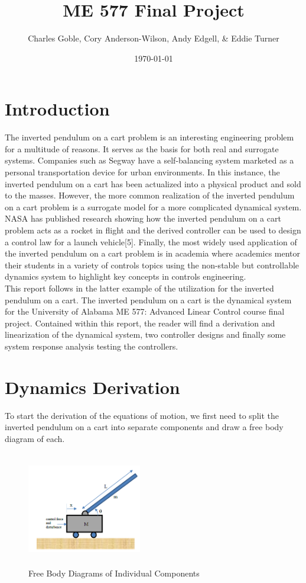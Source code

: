 \documentclass[titlepage]{article}
\title{ME 577 Final Project}
\author{Charles Goble, Cory Anderson-Wilson, Andy Edgell, \& Eddie Turner}
\date{\today}
\begin{document}
\maketitle
\tableofcontents

\newpage
\section{Introduction}
The inverted pendulum on a cart problem is an interesting engineering problem for a multitude of reasons. It serves as the basis for both real and surrogate systems. Companies such as Segway\texttrademark{} have a self-balancing system marketed as a personal transportation device for urban environments. In this instance, the inverted pendulum on a cart has been actualized into a physical product and sold to the masses. However, the more common realization of the inverted pendulum on a cart problem is a surrogate model for a more complicated dynamical system. NASA has published research showing how the inverted pendulum on a cart problem acts as a rocket in flight and the derived controller can be used to design a control law for a launch vehicle[5]. Finally, the most widely used application of the inverted pendulum on a cart problem is in academia where academics mentor their students in a variety of controls topics using the non-stable but controllable dynamics system to highlight key concepts in controls engineering.\\

This report follows in the latter example of the utilization for the inverted pendulum on a cart. The inverted pendulum on a cart is the dynamical system for the University of Alabama ME 577: Advanced Linear Control course final project. Contained within this report, the reader will find a derivation and linearization of the dynamical system, two controller designs and finally some system response analysis testing the controllers.

\newpage
\section{Dynamics Derivation}
To start the derivation of the equations of motion, we first need to split the inverted pendulum on a cart into separate components and draw a free body diagram of each.

\begin{figure}[H]
\center
\includegraphics[width=5cm, height=5cm]{prompt_diagram.png}
\caption{Free Body Diagrams of Individual Components}
\end{figure}
\end{document}
